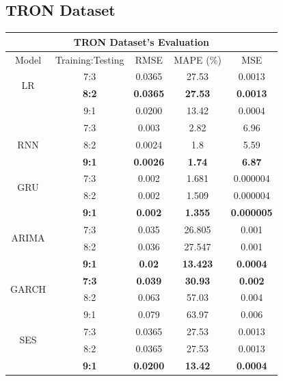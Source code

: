 \documentclass{ieeeojies}
\begin{document}
\subsection{TRON Dataset}
\vspace{-2mm}
\begin{table}[H]
  \centering
  \begin{tabular}{|c|c|c|c|c|}
    \hline
    \multicolumn{5}{|c|}{\textbf{TRON Dataset's Evaluation}}                                     \\
    \hline
    \centering Model       & Training:Testing & RMSE           & MAPE (\%)      & MSE            \\
    \hline
    \multirow{2}{*}{LR}    & 7:3              & 0.0365         & 27.53          & 0.0013         \\ & \textbf{8:2} & \textbf{0.0365} & \textbf{27.53} & \textbf{0.0013} \\ & 9:1 & 0.0200 & 13.42 & 0.0004\\
    \hline
    \multirow{3}{*}{RNN}   & 7:3              & 0.003          & 2.82           & 6.96           \\ & 8:2 & 0.0024 & 1.8 & 5.59 \\ & \textbf{9:1} & \textbf{0.0026} & \textbf{1.74} & \textbf{6.87} \\
    \hline
    \multirow{2}{*}{GRU}   & 7:3              & 0.002          & 1.681          & 0.000004       \\ & 8:2 & 0.002 & 1.509 & 0.000004 \\ & \textbf{9:1} & \textbf{0.002}  & \textbf{1.355} & \textbf{0.000005}\\
    \hline
    \multirow{2}{*}{ARIMA} & 7:3              & 0.035          & 26.805         & 0.001          \\ & 8:2 &  0.036 & 27.547 & 0.001 \\ & \textbf{9:1} & \textbf{0.02}  & \textbf{13.423} &\textbf{0.0004}\\
    \hline
    \multirow{2}{*}{GARCH} & \textbf{7:3}     & \textbf{0.039} & \textbf{30.93} & \textbf{0.002} \\
                           & 8:2              & 0.063          & 57.03          & 0.004          \\
                           & 9:1              & 0.079          & 63.97          & 0.006          \\
    \hline
    \multirow{2}{*}{SES}   & 7:3              & 0.0365         & 27.53          & 0.0013         \\ & 8:2 & 0.0365 &27.53 & 0.0013\\ & \textbf{9:1} &  \textbf{0.0200} & \textbf{13.42} & \textbf{0.0004} \\

\end{tabular}
\end{table}
\end{document}
